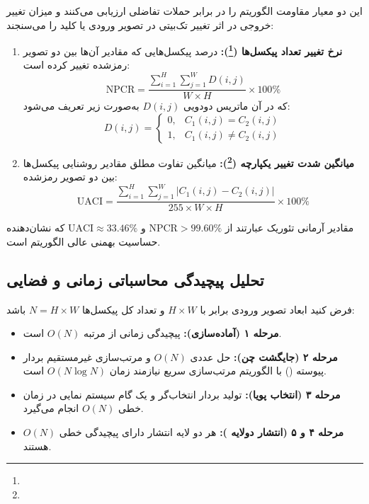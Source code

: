 این دو معیار مقاومت الگوریتم را در برابر حملات تفاضلی ارزیابی می‌کنند و میزان تغییر خروجی در اثر تغییر تک‌بیتی در تصویر ورودی یا کلید را می‌سنجند:

\begin{enumerate}
    \item \textbf{نرخ تغییر تعداد پیکسل‌ها (\footnote{}):} درصد پیکسل‌هایی که مقادیر آن‌ها بین دو تصویر رمزشده تغییر کرده است:
    \begin{equation}
    \mathrm{NPCR} = \frac{\sum_{i=1}^H \sum_{j=1}^W D(i,j)}{W \times H} \times 100\%
    \label{eq:ch3-npcr}
    \end{equation}
    که در آن ماتریس دودویی $D(i,j)$ به‌صورت زیر تعریف می‌شود:
    \begin{equation}
    D(i,j) = \begin{cases}
    0, & C_1(i,j) = C_2(i,j) \\
    1, & C_1(i,j) \neq C_2(i,j)
    \end{cases}
    \end{equation}
    \item \textbf{میانگین شدت تغییر یکپارچه (\footnote{}):} میانگین تفاوت مطلق مقادیر روشنایی پیکسل‌ها بین دو تصویر رمزشده:
    \begin{equation}
    \mathrm{UACI} = \frac{\sum_{i=1}^H \sum_{j=1}^W \left|C_1(i,j) - C_2(i,j)\right|}{255 \times W \times H} \times 100\%
    \label{eq:ch3-uaci}
    \end{equation}
\end{enumerate}
مقادیر آرمانی تئوریک عبارتند از $\mathrm{NPCR} > 99.60\%$ و $\mathrm{UACI} \approx 33.46\%$ که نشان‌دهنده حساسیت بهمنی عالی الگوریتم است\cite{ref10}.

\subsection{تحلیل پیچیدگی محاسباتی زمانی و فضایی}

فرض کنید ابعاد تصویر ورودی برابر با $H \times W$ و تعداد کل پیکسل‌ها $N = H \times W$ باشد:
\begin{itemize}
    \item \textbf{مرحله ۱ (آماده‌سازی):} پیچیدگی زمانی از مرتبه $O(N)$ است.
    \item \textbf{مرحله ۲ (جایگشت چن):} حل عددی $O(N)$ و مرتب‌سازی غیرمستقیم بردار پیوسته () با الگوریتم مرتب‌سازی سریع نیازمند زمان $O(N \log N)$ است.
    \item \textbf{مرحله ۳ (انتخاب پویا):} تولید بردار انتخاب‌گر و یک گام سیستم نمایی در زمان خطی $O(N)$ انجام می‌گیرد.
    \item \textbf{مرحله ۴ و ۵ (انتشار دولایه ):} هر دو لایه انتشار دارای پیچیدگی خطی $O(N)$ هستند.
\end{itemize}

